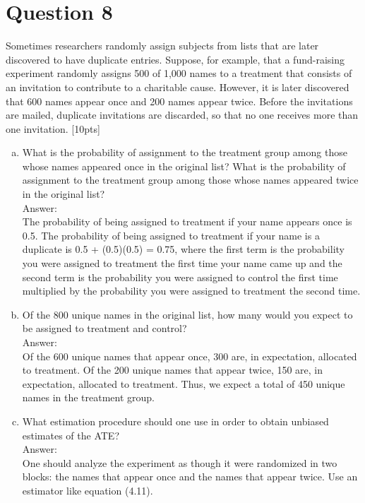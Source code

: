 \documentclass[11pt,notitlepage]{article}\usepackage[]{graphicx}\usepackage[]{color}
\begin{document}
\section*{Question 8}
Sometimes researchers randomly assign subjects from lists that are later discovered to have duplicate entries. Suppose, for example, that a fund-raising experiment randomly assigns 500 of 1,000 names to a treatment that consists of an invitation to contribute to a charitable cause.  However, it is later discovered that 600 names appear once and 200 names appear twice. Before the invitations are mailed, duplicate invitations are discarded, so that no one receives more than one invitation.  [10pts]
\begin{enumerate}[a)]
\item What is the probability of assignment to the treatment group among those whose names appeared once in the original list?  What is the probability of assignment to the treatment group among those whose names appeared twice in the original list?\\
Answer:\\
The probability of being assigned to treatment if your name appears once is 0.5. The probability of being assigned to treatment if your name is a duplicate is 0.5 + (0.5)(0.5) = 0.75, where the first term is the probability you were assigned to treatment the first time your name came up and the second term is the probability you were assigned to control the first time multiplied by the probability you were assigned to treatment the second time.

\item Of the 800 unique names in the original list, how many would you expect to be assigned to treatment and control?  \\
Answer:\\
Of the 600 unique names that appear once, 300 are, in expectation, allocated to treatment. Of the 200 unique names that appear twice, 150 are, in expectation, allocated to treatment. Thus, we expect a total of 450 unique names in the treatment group.
\item What estimation procedure should one use in order to obtain unbiased estimates of the ATE?\\
Answer:\\
One should analyze the experiment as though it were randomized in two blocks: the names that appear once and the names that appear twice. Use an estimator like equation (4.11).
\end{enumerate}
\end{document}
